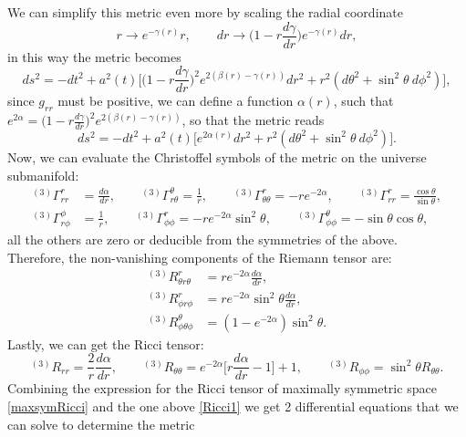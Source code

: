 We can simplify this metric even more by scaling the radial coordinate
\begin{equation}
    r\rightarrow e^{-\gamma(r)}r,\qquad dr\rightarrow \bigg(1-r\frac{d\gamma}{dr}\bigg)e^{-\gamma(r)}dr,
\end{equation}
in this way the metric becomes
\begin{equation}
    ds^2=-dt^2+a^2(t)\bigg[\bigg(1-r\frac{d\gamma}{dr}\bigg)^{2}e^{2(\beta(r)-\gamma(r))}dr^2+r^2(d\theta^2+\sin^2\theta\ d\phi^2)\bigg],
\end{equation}
since $g_{rr}$ must be positive, we can define a function $\alpha(r)$, such that $e^{2\alpha}=\big(1-r\frac{d\gamma}{dr}\big)^{2}e^{2(\beta(r)-\gamma(r))}$, so that the metric reads
\begin{equation}
    ds^2=-dt^2+a^2(t)\big[e^{2\alpha(r)}dr^2+r^2(d\theta^2+\sin^2\theta\ d\phi^2)\big].
\end{equation}
Now, we can evaluate the Christoffel symbols of the metric on the universe submanifold:
\begin{align}
    ^{(3)}\Gamma_{rr}^r&=\frac{d\alpha}{dr},\qquad^{(3)}\Gamma_{r\theta}^\theta=\frac{1}{r},\qquad^{(3)}\Gamma_{\theta\theta}^r=-re^{-2\alpha},\qquad^{(3)}\Gamma_{rr}^r=\frac{\cos\theta}{\sin\theta},\nonumber\\
    ^{(3)}\Gamma_{r\phi}^\phi&=\frac{1}{r},\qquad^{(3)}\Gamma_{\phi\phi}^r=-re^{-2\alpha}\sin^2\theta,\qquad^{(3)}\Gamma_{\phi\phi}^\theta=-\sin\theta\cos\theta,
\end{align}
all the others are zero or deducible from the symmetries of the above.\\ Therefore, the non-vanishing components of the Riemann tensor are:
\begin{align}
    ^{(3)}R^r_{\theta r\theta}&=re^{-2\alpha}\frac{d\alpha}{dr},\nonumber\\
    ^{(3)}R^r_{\phi r\phi}&=re^{-2\alpha}\sin^2\theta\frac{d\alpha}{dr},\nonumber\\
    ^{(3)}R^\theta_{\phi \theta\phi}&=(1-e^{-2\alpha})\sin^2\theta.
\end{align}
Lastly, we can get the Ricci tensor:
\begin{equation}
    ^{(3)}R_{rr}=\frac{2}{r}\frac{d\alpha}{dr},\qquad ^{(3)}R_{\theta\theta}=e^{-2\alpha}\bigg[r\frac{d\alpha}{dr}-1\bigg]+1,\qquad ^{(3)}R_{\phi\phi}=\sin^2\theta R_{\theta\theta}.\label{Ricci1}
\end{equation}
Combining the expression for the Ricci tensor of maximally symmetric space \eqref{maxsymRicci} and the one above \eqref{Ricci1} we get 2 differential equations that we can solve to determine the metric
